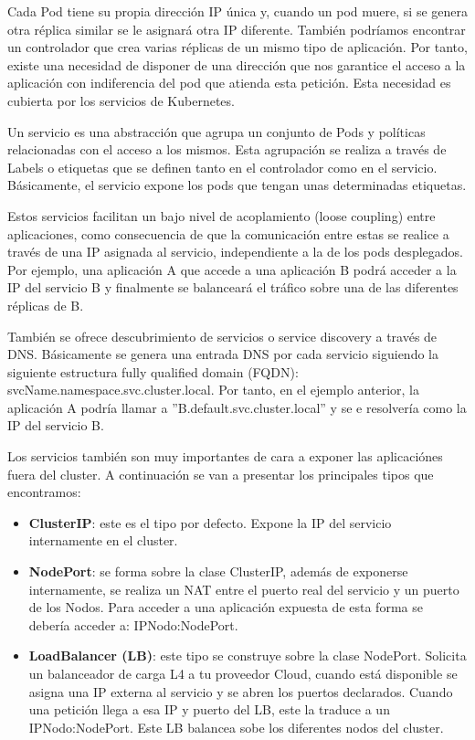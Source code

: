 \documentclass[spanish,twoside,12pt,a4paper]{book}
\begin{document}
Cada Pod tiene su propia dirección IP única y, cuando un pod muere, si se genera otra réplica similar  se le asignará otra IP diferente. También podríamos encontrar un controlador que crea varias réplicas de un mismo tipo de aplicación. Por tanto, existe una necesidad de disponer de una dirección que nos garantice el acceso a la aplicación con indiferencia del pod que atienda esta petición. Esta necesidad es cubierta por los servicios de Kubernetes. 

Un servicio es una abstracción que agrupa un conjunto de Pods y políticas relacionadas con el acceso a los mismos. Esta agrupación se realiza a través de Labels o etiquetas que se definen tanto en el controlador como en el servicio. Básicamente, el servicio expone los pods que tengan unas determinadas etiquetas.

Estos servicios facilitan un bajo nivel de acoplamiento (loose coupling) entre aplicaciones, como consecuencia de que la comunicación entre estas se realice a través de una IP asignada al servicio, independiente a la de los pods desplegados. Por ejemplo, una aplicación A que accede a una aplicación B podrá acceder a la IP del servicio B y finalmente se balanceará el tráfico sobre una de las diferentes réplicas de B.

También se ofrece descubrimiento de servicios o  service discovery a través de DNS. Básicamente se genera una entrada DNS por cada servicio siguiendo la siguiente estructura fully qualified domain (FQDN): svcName.namespace.svc.cluster.local. Por tanto, en el ejemplo anterior, la aplicación A podría llamar a ”B.default.svc.cluster.local” y se e resolvería como la IP del servicio B.

Los servicios también son muy importantes de cara a exponer las aplicaciónes fuera del cluster. A continuación se van a presentar los principales tipos que encontramos:

\begin{itemize}
	\item \textbf{ClusterIP}: este es el tipo por defecto. Expone la IP del servicio internamente en el cluster.
	
    \item \textbf{NodePort}: se forma sobre la clase ClusterIP, además de exponerse internamente, se realiza un NAT entre el puerto real del servicio y un puerto de los Nodos. Para acceder a una aplicación expuesta de esta forma se debería acceder a: IPNodo:NodePort.
    
    \item \textbf{LoadBalancer (LB)}: este tipo se construye sobre la clase NodePort. Solicita un balanceador de carga L4 a tu proveedor Cloud, cuando está disponible se asigna una IP externa al servicio y se abren los puertos declarados. Cuando una petición llega a esa IP y puerto del LB, este la traduce a un IPNodo:NodePort. Este LB balancea sobe los diferentes nodos del cluster.
\end{itemize}
\end{document}
